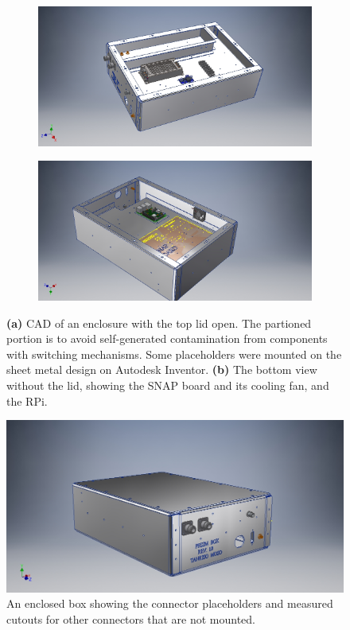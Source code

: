 \begin{figure}
	\centering
	\begin{subfigure}[t]{0.52\textwidth}
		\centering
		\includegraphics[width=\linewidth]{"Figures/Top Open"} 
		\caption{} \label{Fig:Top Open}
	\end{subfigure}
	\hfill
	\begin{subfigure}[t]{0.46\textwidth}
		\centering
		\includegraphics[width=\linewidth]{"Figures/Bottom Open"}
		\caption{} \label{Fig:Bottom Open}
	\end{subfigure}
	\caption{{\bf (a)} CAD of an enclosure with the top lid open. The partioned portion is to avoid self-generated contamination from components with switching mechanisms. Some placeholders were mounted on the sheet metal design on Autodesk Inventor. {\bf (b)} The bottom view without the lid, showing the SNAP board and its cooling fan, and the RPi. } \label{Fig:farap}
\end{figure}


\begin{figure}
	\centering
	\includegraphics[width=0.7\linewidth]{Figures/Enclosed}
	\caption{An enclosed box showing the connector placeholders and measured cutouts for other connectors that are not mounted.}
	\label{Fig:Enclosed}
\end{figure}

